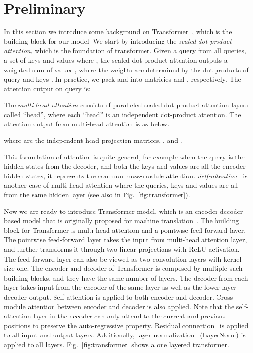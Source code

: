 \documentclass[10pt,twocolumn,letterpaper]{article}
\begin{document}
\section{Preliminary}
\label{sec:preliminary}
In this section we introduce some background on Transformer~\cite{vaswani2017attention}, which is the building block for our model. 
We start by introducing the \emph{scaled dot-product attention}, which is the foundation of transformer. Given a query  from all  queries, a set of keys  and values  where , the scaled dot-product attention outputs a weighted sum of values , where the weights are determined by the dot-products of query  and keys . In practice, we pack  and  into matricies  and , respectively. The attention output on query  is:

The \emph{multi-head attention} consists of  paralleled scaled dot-product attention layers called ``head'', where each ``head'' is an independent dot-product attention. The attention output from multi-head attention is as below:

where  are the independent head projection matrices, , and .

This formulation of attention is quite general, for example when the query is the hidden states from the decoder, and both the keys and values are all the encoder hidden states, it represents the common cross-module attention.
\emph{Self-attention}~\cite{vaswani2017attention} is another case of multi-head attention where the queries, keys and values are all from the same hidden layer (see also in Fig.~\ref{fig:transformer}). 

Now we are ready to introduce Transformer model, which is an encoder-decoder based model that is originally proposed for machine translation~\cite{vaswani2017attention}. The building block for Transformer is multi-head attention and a pointwise feed-forward layer. The pointwise feed-forward layer takes the input from multi-head attention layer, and further transforms it through two linear projections with ReLU activation. The feed-forward layer can also be viewed as two convolution layers with kernel size one. The encoder and decoder of Transformer is composed by multiple such building blocks, and they have the same number of layers. The decoder from each layer takes input from the encoder of the same layer as well as the lower layer decoder output. Self-attention is applied to both encoder and decoder. Cross-module attention between encoder and decoder is also applied.
Note that the self-attention layer in the decoder can only attend to the current and previous positions to preserve the auto-regressive property. 
Residual connection~\cite{he2016deep} is applied to all input and output layers. Additionally, layer normalization~\cite{ba2016layer} (LayerNorm) is applied to all layers. 
Fig.~\ref{fig:transformer} shows a one layered transformer.
\end{document}
